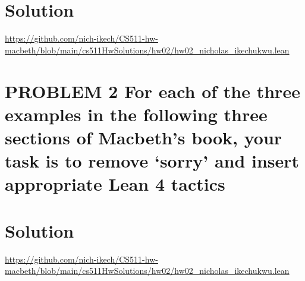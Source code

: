 \documentclass{article}
\begin{document}
\section*{Solution}

\url{https://github.com/nich-ikech/CS511-hw-macbeth/blob/main/cs511HwSolutions/hw02/hw02_nicholas_ikechukwu.lean}

\newpage

\section*{PROBLEM 2 For each of the three examples in the following three sections of Macbeth’s book,
your task is to remove ‘sorry’ and insert appropriate Lean 4 tactics}
\section*{Solution}

\url{https://github.com/nich-ikech/CS511-hw-macbeth/blob/main/cs511HwSolutions/hw02/hw02_nicholas_ikechukwu.lean}
\end{document}
